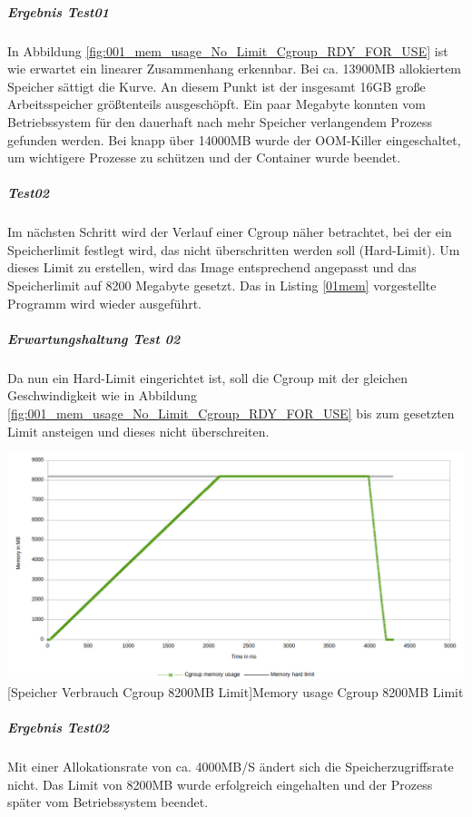 \subparagraph{Ergebnis Test01}
In Abbildung \ref{fig:001_mem_usage_No_Limit_Cgroup_RDY_FOR_USE} ist wie erwartet ein linearer Zusammenhang erkennbar. Bei ca. 13900MB allokiertem Speicher sättigt die Kurve. An diesem Punkt ist der insgesamt 16GB große Arbeitsspeicher größtenteils ausgeschöpft. Ein paar Megabyte konnten vom Betriebssystem für den dauerhaft nach mehr Speicher verlangendem Prozess gefunden werden. Bei knapp über 14000MB wurde der OOM-Killer eingeschaltet, um wichtigere Prozesse zu schützen und der Container wurde beendet.

\subparagraph{Test02}
Im nächsten Schritt wird der Verlauf einer Cgroup näher betrachtet, bei der ein Speicherlimit festlegt wird, das nicht überschritten werden soll (Hard-Limit). Um dieses Limit zu erstellen, wird das Image entsprechend angepasst und das Speicherlimit auf 8200 Megabyte gesetzt. Das in Listing \ref{01mem} vorgestellte Programm wird wieder ausgeführt.

\subparagraph{Erwartungshaltung Test 02}
Da nun ein Hard-Limit eingerichtet ist, soll die Cgroup mit der gleichen Geschwindigkeit wie in Abbildung \ref{fig:001_mem_usage_No_Limit_Cgroup_RDY_FOR_USE} bis zum gesetzten Limit ansteigen und dieses nicht überschreiten. 

\vspace{1em}
\begin{minipage}{\linewidth}
	\centering
	\includegraphics[width=1\linewidth]{pics/002_mem_usage_8200mb_limit_Cgroup_RDY_FOR_USE.png}
	[Speicher Verbrauch Cgroup 8200MB Limit]{Memory usage Cgroup 8200MB Limit}
	\label{fig:002_mem_usage_8200mb_limit_Cgroup_RDY_FOR_USE}
\end{minipage}

\subparagraph{Ergebnis Test02}
Mit einer Allokationsrate von ca. 4000MB/S ändert sich die Speicherzugriffsrate nicht. Das Limit von 8200MB wurde erfolgreich eingehalten und der Prozess später vom Betriebssystem beendet.

